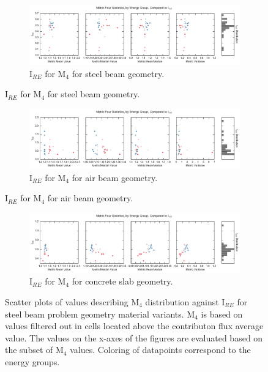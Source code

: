 \begin{figure}[htb!]
  \centering
  \begin{subfigure}[t]{\textwidth}
    \includegraphics[width=\linewidth]{./chapters/characterization_probs/figures/char/prob_1/metric_four_err_stats_mean.pdf}
    \caption{I$_{RE}$ for M$_4$ for steel beam geometry.}
    \label{fig:beamsteelIRE}
  \end{subfigure}
\end{figure}
\begin{figure}[htb!]\ContinuedFloat
  \centering
  \begin{subfigure}[t]{\textwidth}
    \includegraphics[width=\linewidth]{./chapters/characterization_probs/figures/char/prob1v1/metric_four_err_stats_mean.pdf}
    \caption{I$_{RE}$ for M$_4$ for air beam geometry.}
    \label{fig:beamairIRE}
  \end{subfigure}
\end{figure}
\begin{figure}[htb!]\ContinuedFloat
  \centering
  \begin{subfigure}[t]{\textwidth}
    \includegraphics[width=\linewidth]{./chapters/characterization_probs/figures/char/prob1v2/metric_four_err_stats_mean.pdf}
    \caption{I$_{RE}$ for M$_4$ for concrete slab geometry.}
    \label{fig:beamconcreteIRE}
  \end{subfigure}
  \caption[Scatter plots of values describing M$_4$ distribution against I$_{RE}$
  for steel beam problem geometry material variants.]{Scatter plots of values
    describing M$_4$ distribution against I$_{RE}$ for steel beam problem
    geometry material variants. M$_4$ is based on values filtered out in cells
  located above the contributon flux average value. The values on the x-axes of
the figures are evaluated based on the subset of M$_4$ values. Coloring of
datapoints correspond to the energy groups.}
  \label{fig:beamIREs}
\end{figure}

